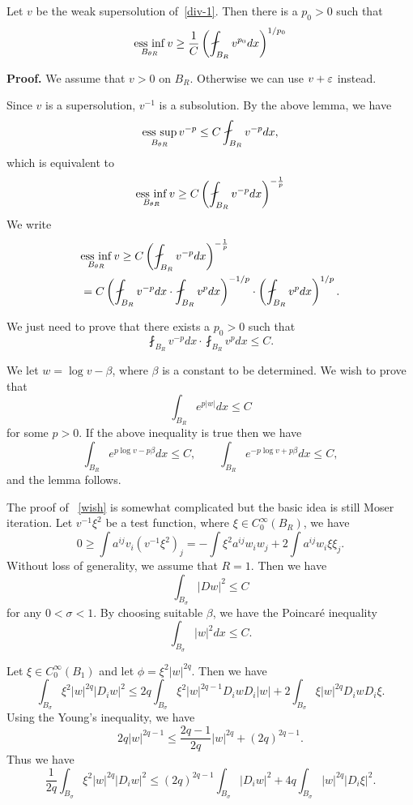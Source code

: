 \begin{lemma} Let $v$ be the weak supersolution of~\eqref{div-1}. Then there is a $p_0>0$ such that
\[
\underset{B_{\theta R}}{{\rm ess}\,\inf}\, v\geq\frac{1}{C}\left(\fint_{B_R}v^{p_0} dx\right)^{1/p_0}
\]
\end{lemma}

{\bf Proof.} We assume that $v>0$ on $B_R$. Otherwise we can use $v+\varepsilon$ instead.

Since $v$ is a supersolution, $v^{-1}$ is a subsolution. By the above lemma, we have
\[
\underset{B_{\theta R}}{{\rm ess}\,\sup}\, v^{-p}\leq C\fint_{B_R} v^{-p} dx,
\]
which is equivalent to 
\[
\underset{B_{\theta R}}{{\rm ess}\,\inf}\, v\geq C \left(\fint_{B_R} v^{-p} dx\right)^{-\frac 1p}
\]
We  write 
\begin{align*}
&
\underset{B_{\theta R}}{{\rm ess}\,\inf}\, v\geq C \left(\fint_{B_R} v^{-p} dx\right)^{-\frac 1p}\\
&
=C\left(\fint_{B_R}v^{-p} dx\cdot\fint_{B_R}v^p dx\right)^{-1/p}\cdot\left(\fint_{B_R}v^p dx\right)^{1/p}.
\end{align*}

We just need to prove that there exists a $p_0>0$ such that
\[
\fint_{B_R}v^{-p} dx\cdot\fint_{B_R}v^p dx\leq C.
\]

We let $w=\log v-\beta$, where $\beta$ is a constant to be determined. We wish to prove that
\begin{equation}\label{wish}
\int_{B_R}e^{p|w|} dx\leq C
\end{equation}
for some $p>0$. If the above inequality is true then we have
\[
\int_{B_R}e^{p\log v-p\beta} dx\leq C,\qquad 
\int_{B_R}e^{-p\log v+p\beta} dx\leq C,
\]
and the lemma follows.

The proof of ~\eqref{wish} is somewhat complicated but  the basic idea is still Moser iteration. Let $v^{-1}\xi^2$ be a test function, where $\xi \in C_0^\infty(B_R)$, we have
\[
0\geq\int a^{ij} v_i(v^{-1}\xi^2)_j=-\int \xi^2a^{ij}w_i w_j+2\int a^{ij} w_i \xi\xi_j.
\]
Without loss of generality, we assume that $R=1$. Then we have
\[
\int_{B_\sigma}|Dw|^2\leq C
\]
for any  $0<\sigma<1$. By choosing suitable $\beta$, we have the Poincar\'e inequality
\[
\int_{B_\sigma}|w|^2 dx\leq C.
\]

Let $\xi\in C_0^\infty(B_1)$ and let $\phi=\xi^2|w|^{2q}$. Then we have
\[
\int_{B_\sigma}\xi^2|w|^{2q}|D_i w|^2\leq 2q\int_{B_\sigma}\xi^2|w|^{2q-1} D_i w D_i|w|+2\int_{B_\sigma}\xi|w|^{2q}D_i wD_i \xi.
\]
Using the Young's inequality, we have
\[
2q|w|^{2q-1}\leq\frac{2q-1}{2q}|w|^{2q}+(2q)^{2q-1}.
\]
Thus we have
\[
\frac{1}{2q}\int_{B_\sigma}\xi^2|w|^{2q}|D_iw|^2\leq (2q)^{2q-1}\int_{B_\sigma}|D_i w|^2+4q\int_{B_\sigma}|w|^{2q}|D_i\xi|^2.
\]

